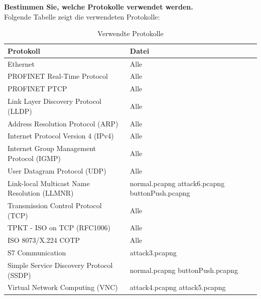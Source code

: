\documentclass[
    a4paper,
    pagesize,
	pdftex,
    12pt,
]{scrartcl}
\begin{document}
\textbf{Bestimmen Sie, welche Protokolle verwendet werden.}
\\
Folgende Tabelle zeigt die verwendeten Protokolle:
\begin{table}[H]
    \centering
    \begin{tabular}{|l|p{5cm}|}
    \hline
    \textbf{Protokoll} & \textbf{Datei} \\
    \hline
    Ethernet & Alle \\
    PROFINET Real-Time Protocol & Alle \\
    PROFINET PTCP & Alle \\
    Link Layer Discovery Protocol (LLDP) & Alle \\
    Address Resolution Protocol (ARP) & Alle \\
    Internet Protocol Version 4 (IPv4) & Alle \\
    Internet Group Management Protocol (IGMP) & Alle \\
    User Datagram Protocol (UDP) & Alle \\
    Link-local Multicast Name Resolution (LLMNR) & normal.pcapng\newline
    attack6.pcapng\newline
    buttonPush.pcapng \\
    Transmission Control Protocol (TCP) & Alle \\
    TPKT - ISO on TCP (RFC1006) & Alle \\
    ISO 8073/X.224 COTP & Alle \\
    S7 Communication & attack3.pcapng \\
    Simple Service Discovery Protocol (SSDP) & normal.pcapng\newline
    buttonPush.pcapng \\
    Virtual Network Computing (VNC) & attack4.pcapng\newline
    attack5.pcapng \\
    \hline
    \end{tabular}
    \caption{Verwendte Protokolle}
    \label{tab:ws-used-protocols}
\end{table}
\end{document}
